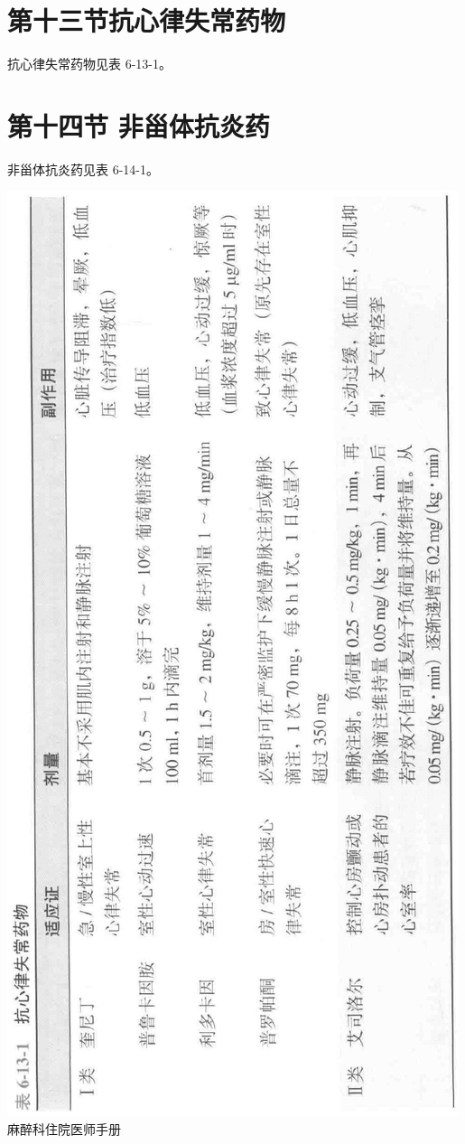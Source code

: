 \documentclass[10pt]{article}
\begin{document}
\section*{第十三节抗心律失常药物}
抗心律失常药物见表 6-13-1。

\section*{第十四节 非甾体抗炎药}
非甾体抗炎药见表 6-14-1。

\includegraphics[max width=\textwidth, center]{2024_07_05_645bb794a4d4f32ee0c8g-351}\\
麻醉科住院医师手册
\end{document}
